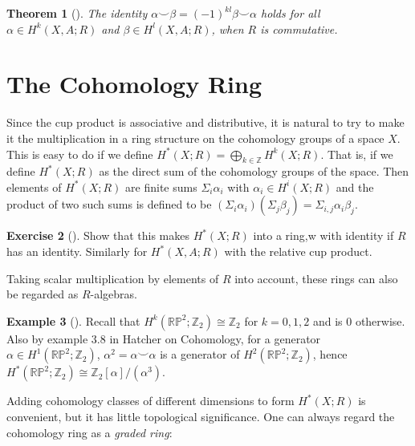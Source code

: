 \documentclass[reqno]{amsart}
\newtheorem{theorem}{Theorem}[section]
\theoremstyle{definition}
\newtheorem{example}[theorem]{Example}
\newtheorem{exercise}[theorem]{Exercise}
\theoremstyle{remark}
\begin{document}
    \begin{theorem}[]
        The identity $\alpha \smile \beta =
        (-1)^{kl} \beta \smile \alpha$ holds
        for all $\alpha \in H^{k}\left( X,A;R \right) $ and
        $\beta \in H^{l}(X,A;R)$, when $R$ is commutative.
    \end{theorem}

    \section{The Cohomology Ring}

    Since the cup product is associative and distributive,
    it is natural to try to make it the
    multiplication in a ring structure on
    the cohomology groups of a space $X$.
    This is easy to do if we define
    $H^{*}(X;R) = \bigoplus_{k \in \mathbb{Z}} H^{k}(X;R)$.
    That is, if we define $H^{*}(X;R)$ as the
    direct sum of the cohomology
    groups of the space. Then
    elements of $H^{*}(X;R)$ are
    finite sums
    $\Sigma_i \alpha_i$ with
    $\alpha_i \in H^{i}(X;R)$ and the
    product of two such sums
    is defined to be
    $\left( \Sigma_i \alpha_i \right) 
    \left( \Sigma_j \beta_j \right) =
    \Sigma_{i,j} \alpha_i \beta_j$.
    
    \begin{exercise}[]
        Show that this makes $H^{*}(X;R)$ into a ring,w
        with identity if $R$ has an identity.
        Similarly for $H^{*}(X,A;R)$ with the relative
        cup product.

        Taking scalar multiplication by elements
        of $R$ into account, these rings
        can also be regarded as $R$-algebras.
    \end{exercise}

    \begin{example}[]
        Recall that
        $H^{k}(\mathbb{R}\mathbb{P}^{2};\mathbb{Z}_2)
        \cong \mathbb{Z}_2$ for
        $k = 0, 1,2$ and is $0$ otherwise.
        Also by example 3.8 in Hatcher on Cohomology,
        for a generator
        $\alpha \in H^{1}(\mathbb{R}\mathbb{P}^2;\mathbb{Z}_2)$,
        $\alpha^2 
        =\alpha \smile \alpha$ is a generator
        of $H^{2}(\mathbb{R}\mathbb{P}^2; \mathbb{Z}_2)$,
        hence
        $H^{*}(\mathbb{R}\mathbb{P}^2;\mathbb{Z}_2) \cong
        \mathbb{Z}_2 \left[ \alpha \right] /
        \left( \alpha^3 \right) $.
    \end{example}

    Adding cohomology classes of different dimensions
    to form $H^{*}(X;R)$ is convenient, but it has
    little topological significance. One
    can always regard the
    cohomology ring as a \textit{graded ring}:
\end{document}
